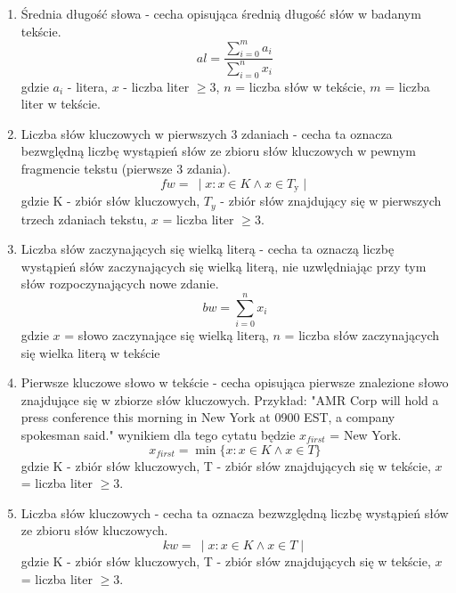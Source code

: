 \documentclass{article}
\begin{document}
\begin{enumerate}
    \item Średnia długość słowa - cecha opisująca średnią długość słów w badanym tekście.
     \begin{equation}
            al = \frac{\sum_{i=0}^{m} a_i}{\sum_{i=0}^{n} x_i}
        \end{equation}
        gdzie \( a_i \) - litera, \( x \) - liczba liter \( \geq 3 \), \( n \) = liczba słów w tekście, \( m \) = liczba liter w tekście.
    \item Liczba słów kluczowych w pierwszych 3 zdaniach - cecha ta oznacza bezwględną liczbę wystąpień słów ze zbioru słów kluczowych w pewnym fragmencie tekstu (pierwsze 3 zdania).
        \begin{equation}
            fw = \ \mid x : x \in K \wedge x \in T_{\text{y}} \mid
        \end{equation}
        gdzie K - zbiór słów kluczowych, \( T_y \) - zbiór słów znajdujący się w pierwszych trzech zdaniach tekstu, \( x\) = liczba liter \( \geq 3 \).
    \item Liczba słów zaczynających się wielką literą - cecha ta oznaczą liczbę wystąpień słów zaczynających się wielką literą, nie uzwlędniając przy tym słów rozpoczynających nowe zdanie.
        \begin{equation}
            bw = \sum_{i=0}^{n} x_i
        \end{equation}
        gdzie \( x \) = słowo zaczynające się wielką literą, \( n \) = liczba słów zaczynających się wielka literą w tekście
    \item Pierwsze kluczowe słowo w tekście - cecha opisująca pierwsze znalezione słowo znajdujące się w zbiorze słów kluczowych. Przykład: "AMR Corp will hold a press conference this morning in New York at 0900 EST, a company spokesman said." wynikiem dla tego cytatu będzie \(x_{first} \) = New York.
       \begin{equation}
            x_{first} = \min \{x: x \in K \land x \in T \}
        \end{equation}
        gdzie K - zbiór słów kluczowych, T - zbiór słów znajdujących się w tekście, \( x \) = liczba liter \( \geq 3 \).
    \item Liczba słów kluczowych - cecha ta oznacza bezwzględną liczbę wystąpień słów ze zbioru słów kluczowych. 
        \begin{equation}
            kw = \ \mid x : x \in K \land x \in T \mid
        \end{equation}
        gdzie K - zbiór słów kluczowych, T - zbiór słów znajdujących się w tekście, \( x \) = liczba liter \( \geq 3 \).

\end{enumerate}
\end{document}
